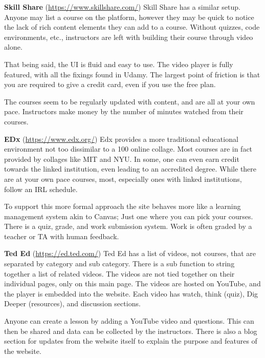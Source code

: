 \documentclass{article}
\begin{document}
\textbf{Skill Share} (\url{https://www.skillshare.com/})
Skill Share has a similar setup. Anyone may list a course on the platform,
however they may be quick to notice the lack of rich content elements they can
add to a course. Without quizzes, code environments, etc., instructors are
left with building their course through video alone.

That being said, the UI is fluid and easy to use. The video player is fully
featured, with all the fixings found in Udamy. The largest point of friction is
that you are required to give a credit card, even if you use the free
plan.

The courses seem to be regularly updated with content, and are all at your own
pace. Instructors make money by the number of minutes watched from their
courses. \vspace{\baselineskip}

\textbf{EDx} (\url{https://www.edx.org/})
Edx provides a more traditional educational environment not too dissimilar to a 100%
online collage. Most courses are in fact provided by collages like MIT and NYU.
In some, one can even earn credit towards the linked institution, even leading
to an accredited degree. While there are at your own pace courses,
most, especially ones with linked institutions, follow an IRL schedule.

To support this more formal approach the site behaves more like a learning
management system akin to Canvas; Just one where you can pick your courses.
There is a quiz, grade, and work submission system. Work is often graded by a
teacher or TA with human feedback. \vspace{\baselineskip}

\textbf{Ted Ed} (\url{https://ed.ted.com/})
Ted Ed has a list of videos, not courses, that are separated by category and sub category. There is a sub function to string together a list of related videos. The videos are not tied together on their individual pages, only on this main page. The videos are hosted on YouTube, and the player is embedded into the website. Each video has watch, think (quiz), Dig Deeper (resources), and discussion sections.

Anyone can create a lesson by adding a YouTube video and questions. This can then be shared and data can be collected by the instructors. There is also a blog section for updates from the website itself to explain the purpose and features of the website. \vspace{\baselineskip}
\end{document}
